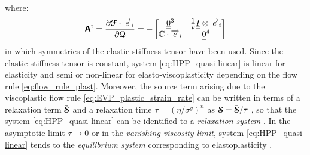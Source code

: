 where:
\begin{equation*}
  \boldsymbol{\mathsf{A}}^i=\frac{\partial {\boldsymbol{\mathcal{F}}}\cdot {\overrightarrow{e}}_i}{\partial {\boldsymbol{\mathcal{Q}}}}=-\left[\begin{matrix}{\underline{\underline{0}}}^3 & \frac{1}{\rho}{\underline{\underline{I}}}\otimes{\overrightarrow{e}}_i\\\mathbb{C}\cdot{\overrightarrow{e}}_i & {\underline{\underline{0}}}^4\end{matrix}\right]
\end{equation*}
in which symmetries of the elastic stiffness tensor have been used. Since the elastic stiffness tensor is constant, system \eqref{eq:HPP_quasi-linear} is linear for elasticity and semi or non-linear for elasto-viscoplasticity depending on the flow rule \eqref{eq:flow_rule_plast}. Moreover, the source term arising due to the viscoplastic flow rule \eqref{eq:EVP_plastic_strain_rate} can be written in terms of a relaxation term $\bar{{\boldsymbol{\mathcal{S}}}}$ and a relaxation time $\tau=(\eta/\sigma^y)^n$ as ${\boldsymbol{\mathcal{S}}}=\bar{{\boldsymbol{\mathcal{S}}}}/\tau$ \cite{Thomas_EVP}, so that the system \eqref{eq:HPP_quasi-linear} can be identified to a \textit{relaxation system} \cite{Relaxation_syst}. In the asymptotic limit $\tau \rightarrow 0$ or in the \textit{vanishing viscosity limit}, system \eqref{eq:HPP_quasi-linear} tends to the \textit{equilibrium system} corresponding to elastoplasticity \cite{Thomas_EVP}.


